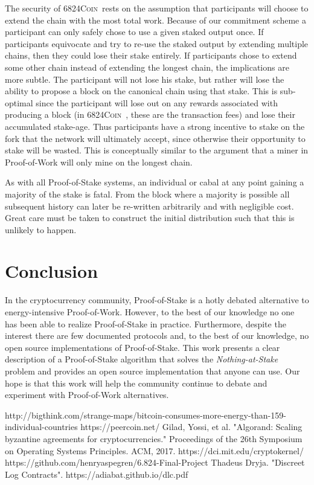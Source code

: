 \documentclass{article}
\newcommand{\coin}{ \textsc{6824Coin}\ }
\begin{document}
The security of \coin rests on the assumption that participants will choose to extend the chain with the most total work. Because of our commitment scheme a participant can only safely chose to use a given staked output once. If participants equivocate and try to re-use the staked output by extending multiple chains, then they could lose their stake entirely. If participants chose to extend some other chain instead of extending the longest chain, the implications are more subtle. The participant will not lose his stake, but rather will lose the ability to propose a block on the canonical chain using that stake. This is sub-optimal since the participant will lose out on any rewards associated with producing a block (in \coin, these are the transaction fees) and lose their accumulated stake-age. Thus participants have a strong incentive to stake on the fork that the network will ultimately accept, since otherwise their opportunity to stake will be wasted. This is conceptually similar to the argument that a miner in Proof-of-Work will only mine on the longest chain. 

As with all Proof-of-Stake systems, an individual or cabal at any point gaining a majority of the stake is fatal. From the block where a majority is possible all subsequent history can later be re-written arbitrarily and with negligible cost. Great care must be taken to construct the initial distribution such that this is unlikely to happen.

\section{Conclusion}
In the cryptocurrency community, Proof-of-Stake is a hotly debated alternative to energy-intensive Proof-of-Work. However, to the best of our knowledge no one has been able to realize Proof-of-Stake in practice. Furthermore, despite the interest there are few documented protocols and, to the best of our knowledge, no open source implementations of Proof-of-Stake. This work presents a clear description of a Proof-of-Stake algorithm that solves the \textit{Nothing-at-Stake} problem and provides an open source implementation that anyone can use. Our hope is that this work will help the community continue to debate and experiment with Proof-of-Work alternatives.    


\begin{thebibliography}{9}
http://bigthink.com/strange-maps/bitcoin-consumes-more-energy-than-159-individual-countries
https://peercoin.net/
Gilad, Yossi, et al. "Algorand: Scaling byzantine agreements for cryptocurrencies." Proceedings of the 26th Symposium on Operating Systems Principles. ACM, 2017.
https://dci.mit.edu/cryptokernel/
https://github.com/henryaspegren/6.824-Final-Project
 Thadeus Dryja. "Discreet Log Contracts". https://adiabat.github.io/dlc.pdf
\end{thebibliography}
\end{document}

